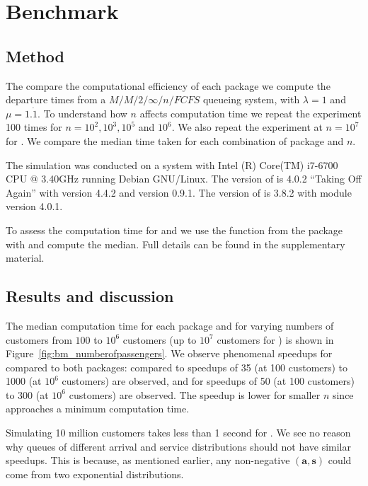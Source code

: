 \documentclass[article]{jss}
\begin{document}
\section{Benchmark} \label{sec:Benchmark}

\subsection{Method}

The compare the computational efficiency of each package we compute
the departure times from a $M/M/2/\infty/n/\mathit{FCFS}$ queueing
system, with $\lambda = 1$ and $\mu = 1.\dot{1}$. To understand how
$n$ affects computation time we repeat the experiment 100 times for
$n = 10^2, 10^3, 10^5$ and $10^6 $. We also repeat the experiment at
$n = 10^7$ for . We compare the median time taken
for each combination of package and $n$.

The simulation was conducted on a system with Intel (R) Core(TM) i7-6700 CPU @ 3.40GHz running Debian GNU/Linux. The version of  is 4.0.2 ``Taking Off Again'' with  version 4.4.2 and  version 0.9.1. The version of  is 3.8.2 with  module version 4.0.1.

To assess the computation time for  and  we use the  function from the  package \citep{Rpkg_microbenchmark} with  and compute the median. Full details can be found in the supplementary material. 

\subsection{Results and discussion}

The median computation time for each package and for varying numbers of customers from $100$ to $10^6$ customers (up to $10^7$ customers for ) is shown in Figure~\ref{fig:bm_numberofpassengers}. We observe phenomenal speedups for  compared to both packages: compared to  speedups of 35 (at 100 customers) to 1000 (at $10^6$ customers) are observed, and for  speedups of 50 (at 100 customers) to 300 (at $10^6$ customers) are observed. The speedup is lower for smaller $n$ since  approaches a minimum computation time. 

Simulating 10 million customers takes less than 1 second for . We see no reason why queues of different arrival and service distributions should not have similar speedups. This is because, as mentioned earlier, any non-negative $\mathbf{(a,s)}$ could come from two exponential distributions. 
\end{document}
